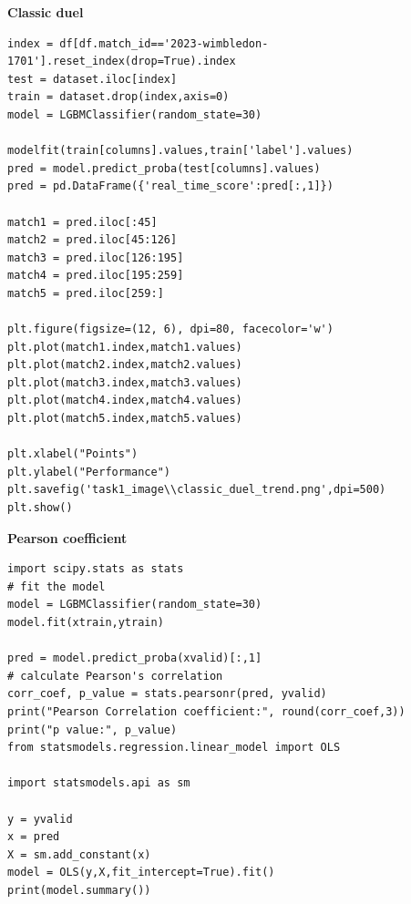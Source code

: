 \documentclass{article}
\begin{document}
\textbf{Classic duel}
\begin{lstlisting}[caption={Classic duel}, label=python-example]
index = df[df.match_id=='2023-wimbledon-1701'].reset_index(drop=True).index
test = dataset.iloc[index]
train = dataset.drop(index,axis=0)
model = LGBMClassifier(random_state=30)

modelfit(train[columns].values,train['label'].values)
pred = model.predict_proba(test[columns].values)
pred = pd.DataFrame({'real_time_score':pred[:,1]})

match1 = pred.iloc[:45]
match2 = pred.iloc[45:126]
match3 = pred.iloc[126:195]
match4 = pred.iloc[195:259]
match5 = pred.iloc[259:]

plt.figure(figsize=(12, 6), dpi=80, facecolor='w')
plt.plot(match1.index,match1.values)
plt.plot(match2.index,match2.values)
plt.plot(match3.index,match3.values)
plt.plot(match4.index,match4.values)
plt.plot(match5.index,match5.values)

plt.xlabel("Points")
plt.ylabel("Performance")
plt.savefig('task1_image\\classic_duel_trend.png',dpi=500)
plt.show()
\end{lstlisting}

\textbf{Pearson coefficient}
\begin{lstlisting}[caption={Pearson coefficient}, label=python-example]
import scipy.stats as stats
# fit the model
model = LGBMClassifier(random_state=30)
model.fit(xtrain,ytrain)
 
pred = model.predict_proba(xvalid)[:,1]
# calculate Pearson's correlation
corr_coef, p_value = stats.pearsonr(pred, yvalid)
print("Pearson Correlation coefficient:", round(corr_coef,3))
print("p value:", p_value)
from statsmodels.regression.linear_model import OLS

import statsmodels.api as sm

y = yvalid
x = pred
X = sm.add_constant(x)
model = OLS(y,X,fit_intercept=True).fit()
print(model.summary())
\end{lstlisting}
\end{document}
